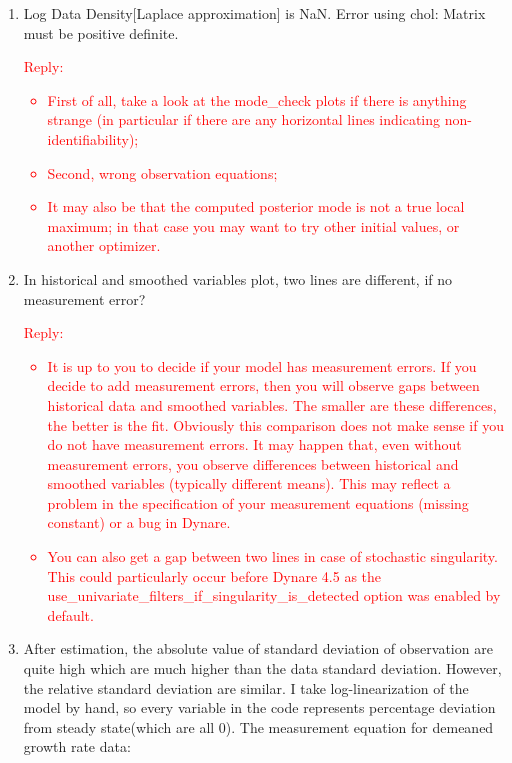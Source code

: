 \documentclass[10pt,math=newtx,citestyle=gb7714-2015,bibstyle=gb7714-2015]{elegantbook}
\begin{document}
{{{\begin{enumerate}
{\begin{itemize}
				\item Check prior shape (e.g. Inf density at bounds);
				\item Increase the informativeness of the prior.
			\end{itemize}
		}
		\item Log Data Density[Laplace approximation] is NaN. Error using chol: Matrix must be positive definite.\\
		\textcolor{red}{Reply:
			\begin{itemize}
				\item First of all, take a look at the mode\_check plots if there is anything strange (in particular if there are any horizontal lines indicating non-identifiability);
				\item Second, wrong observation equations;
				\item It may also be that the computed posterior mode is not a true local maximum; in that case you may want to try other initial values, or another optimizer.
			\end{itemize}
		}
		\item In historical and smoothed variables plot, two lines are different, if no measurement error?\\
		\textcolor{red}{Reply:
			\begin{itemize}
				\item It is up to you to decide if your model has measurement errors. If you decide to add measurement errors, then you will observe gaps between historical data and smoothed variables. The smaller are these differences, the better is the fit. Obviously this comparison does not make sense if you do not have measurement errors. It may happen that, even without measurement errors, you observe differences between historical and smoothed variables (typically different means). This may reflect a problem in the specification of your measurement equations (missing constant) or a bug in Dynare.
				\item You can also get a gap between two lines in case of stochastic singularity. This could particularly occur before Dynare 4.5 as the use\_univariate\_filters\_if\_singularity\_is\_detected option was enabled by default.
		\end{itemize}}
		\item After estimation, the absolute value of standard deviation of observation are quite high which are much higher than the data standard deviation. However, the relative standard deviation are similar. I take log-linearization of the model by hand, so every variable in the code represents percentage deviation from steady state(which are all 0). The measurement equation for demeaned growth rate data:

\end{enumerate}}}}
\end{document}

